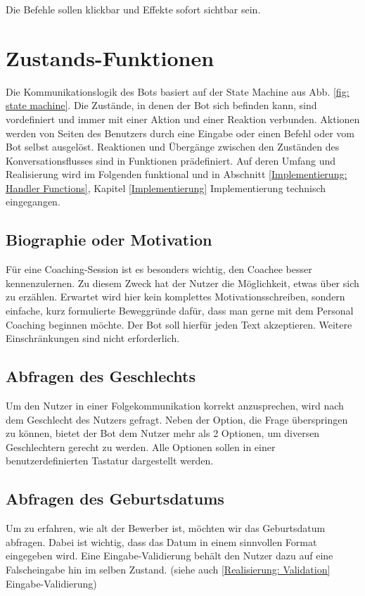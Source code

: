             Die Befehle sollen klickbar und Effekte sofort sichtbar sein.

    \section{Zustands-Funktionen} \label{Realisierung: state functions}
        Die Kommunikationslogik des Bots basiert auf der State Machine aus Abb. \ref*{fig: state machine}. Die Zustände, in denen der Bot sich befinden kann, sind vordefiniert und immer mit einer Aktion und einer Reaktion verbunden. Aktionen werden von Seiten des Benutzers durch eine Eingabe oder einen Befehl oder vom Bot selbst ausgelöst. Reaktionen und Übergänge zwischen den Zuständen des Konversationsflusses sind in Funktionen prädefiniert. Auf deren Umfang und Realisierung wird im Folgenden funktional und in Abschnitt \ref*{Implementierung: Handler Functions}, Kapitel \ref{Implementierung} Implementierung technisch eingegangen.
            
        \subsection{Biographie oder Motivation}
            Für eine Coaching-Session ist es besonders wichtig, den Coachee besser kennenzulernen. Zu diesem Zweck hat der Nutzer die Möglichkeit, etwas über sich zu erzählen. Erwartet wird hier kein komplettes Motivationsschreiben, sondern einfache, kurz formulierte Beweggründe dafür, dass man gerne mit dem Personal Coaching beginnen möchte. Der Bot soll hierfür jeden Text akzeptieren. Weitere Einschränkungen sind nicht erforderlich.
        
        \subsection{Abfragen des Geschlechts}
            Um den Nutzer in einer Folgekommunikation korrekt anzusprechen, wird nach dem Geschlecht des Nutzers gefragt. Neben der Option, die Frage überspringen zu können, bietet der Bot dem Nutzer mehr als 2 Optionen, um diversen Geschlechtern gerecht zu werden. Alle Optionen sollen in einer benutzerdefinierten Tastatur dargestellt werden.
        
        \subsection{Abfragen des Geburtsdatums}    
            Um zu erfahren, wie alt der Bewerber ist, möchten wir das Geburtsdatum abfragen. Dabei ist wichtig, dass das Datum in einem sinnvollen Format eingegeben wird. Eine Eingabe-Validierung behält den Nutzer dazu auf eine Falscheingabe hin im selben Zustand. (siehe auch \ref*{Realisierung: Validation} Eingabe-Validierung)
        
